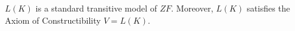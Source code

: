 $L(K)$ is a standard transitive model of $ZF$. Moreover, $L(K)$ satisfies the Axiom of Constructibility $V = L(K)$.
